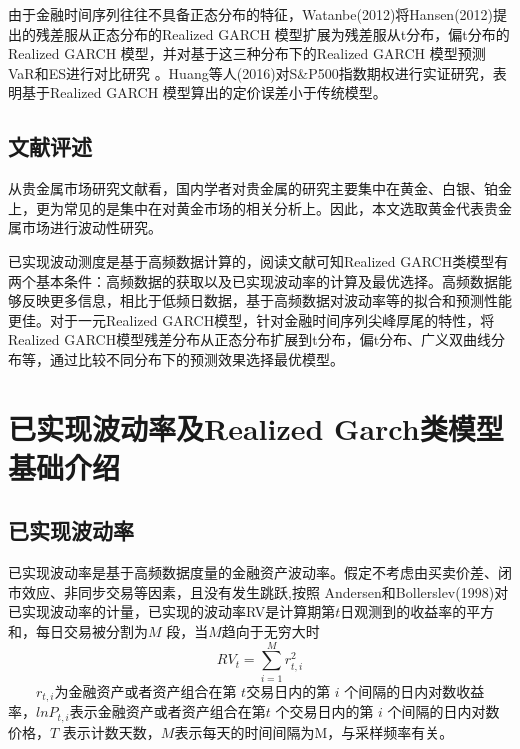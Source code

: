 \documentclass[UTF8,a4paper,12pt]{ctexart}  %
\begin{document}
由于金融时间序列往往不具备正态分布的特征，Watanbe(2012)将Hansen(2012)提出的残差服从正态分布的Realized GARCH 模型扩展为残差服从t分布，偏t分布的Realized GARCH 模型，并对基于这三种分布下的Realized GARCH 模型预测VaR和ES进行对比研究
\citep{Watanabe2012}。Huang等人(2016)对S\&P500指数期权进行实证研究，表明基于Realized
GARCH 模型算出的定价误差小于传统模型\citep{Huang2016b}。

\hypertarget{section-4}{%
\subsection{文献评述}\label{section-4}}

从贵金属市场研究文献看，国内学者对贵金属的研究主要集中在黄金、白银、铂金上，更为常见的是集中在对黄金市场的相关分析上。因此，本文选取黄金代表贵金属市场进行波动性研究。

已实现波动测度是基于高频数据计算的，阅读文献可知Realized GARCH类模型有两个基本条件：高频数据的获取以及已实现波动率的计算及最优选择。高频数据能够反映更多信息，相比于低频日数据，基于高频数据对波动率等的拟合和预测性能更佳。对于一元Realized
GARCH模型，针对金融时间序列尖峰厚尾的特性，将Realized GARCH模型残差分布从正态分布扩展到t分布，偏t分布、广义双曲线分布等，通过比较不同分布下的预测效果选择最优模型。

\hypertarget{realized-garch-1}{%
\section{已实现波动率及Realized Garch类模型基础介绍}\label{realized-garch-1}}

\hypertarget{section-5}{%
\subsection{已实现波动率}\label{section-5}}

已实现波动率是基于高频数据度量的金融资产波动率。假定不考虑由买卖价差、闭市效应、非同步交易等因素，且没有发生跳跃,按照 Andersen和Bollerslev(1998)对已实现波动率的计量，已实现的波动率RV是计算期第\(t\)日观测到的收益率的平方和，每日交易被分割为\(M\)
段，当\(M\)趋向于无穷大时
\protect\hypertarget{eq:RV}{}{\begin{equation}RV_t=\sum_{i=1}^Mr_{t,i}^2\label{eq:RV}\end{equation}}
  \(r_{t,i}\)为金融资产或者资产组合在第 \(t\)交易日内的第 \(i\) 个间隔的日内对数收益率，\(lnP_{t,i}\)表示金融资产或者资产组合在第\(t\) 个交易日内的第 \(i\) 个间隔的日内对数价格，\(T\) 表示计数天数，\(M\)表示每天的时间间隔为M，与采样频率有关\citep{TimBollerslev}。
\end{document}
